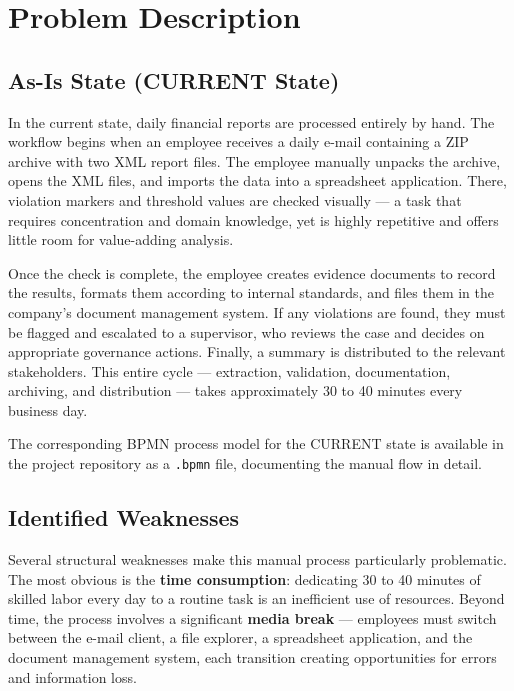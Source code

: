 \documentclass[11pt,a4paper]{article}
\begin{document}

\section{Problem Description}

\subsection{As-Is State (CURRENT State)}

In the current state, daily financial reports are processed entirely by hand. The workflow begins when an employee receives a daily e-mail containing a ZIP archive with two XML report files. The employee manually unpacks the archive, opens the XML files, and imports the data into a spreadsheet application. There, violation markers and threshold values are checked visually --- a task that requires concentration and domain knowledge, yet is highly repetitive and offers little room for value-adding analysis.

Once the check is complete, the employee creates evidence documents to record the results, formats them according to internal standards, and files them in the company's document management system. If any violations are found, they must be flagged and escalated to a supervisor, who reviews the case and decides on appropriate governance actions. Finally, a summary is distributed to the relevant stakeholders. This entire cycle --- extraction, validation, documentation, archiving, and distribution --- takes approximately 30 to 40 minutes every business day.

The corresponding BPMN process model for the CURRENT state is available in the project repository as a \texttt{.bpmn} file, documenting the manual flow in detail.

\subsection{Identified Weaknesses}

Several structural weaknesses make this manual process particularly problematic. The most obvious is the \textbf{time consumption}: dedicating 30 to 40 minutes of skilled labor every day to a routine task is an inefficient use of resources. Beyond time, the process involves a significant \textbf{media break} --- employees must switch between the e-mail client, a file explorer, a spreadsheet application, and the document management system, each transition creating opportunities for errors and information loss.
\end{document}
